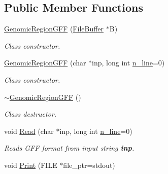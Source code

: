 \subsection*{Public Member Functions}
\begin{CompactItemize}
\item 
\hypertarget{classGenomicRegionGFF_9a49f0dc39116964f774e7ce78cfc827}{
\hyperlink{classGenomicRegionGFF_9a49f0dc39116964f774e7ce78cfc827}{GenomicRegionGFF} (\hyperlink{classFileBuffer}{FileBuffer} $\ast$B)}
\label{classGenomicRegionGFF_9a49f0dc39116964f774e7ce78cfc827}

\begin{CompactList}\small\item\em Class constructor. \item\end{CompactList}\item 
\hypertarget{classGenomicRegionGFF_59dee8d6f9e73b1da46386497030beb2}{
\hyperlink{classGenomicRegionGFF_59dee8d6f9e73b1da46386497030beb2}{GenomicRegionGFF} (char $\ast$inp, long int \hyperlink{classGenomicRegion_efe2255aeed5338060190ded05cb9c0c}{n\_\-line}=0)}
\label{classGenomicRegionGFF_59dee8d6f9e73b1da46386497030beb2}

\begin{CompactList}\small\item\em Class constructor. \item\end{CompactList}\item 
\hypertarget{classGenomicRegionGFF_3885d42a347283a5fed52791988076ad}{
\hyperlink{classGenomicRegionGFF_3885d42a347283a5fed52791988076ad}{$\sim$GenomicRegionGFF} ()}
\label{classGenomicRegionGFF_3885d42a347283a5fed52791988076ad}

\begin{CompactList}\small\item\em Class destructor. \item\end{CompactList}\item 
\hypertarget{classGenomicRegionGFF_eb1390d42b388e32d98f58f57a5c169c}{
void \hyperlink{classGenomicRegionGFF_eb1390d42b388e32d98f58f57a5c169c}{Read} (char $\ast$inp, long int \hyperlink{classGenomicRegion_efe2255aeed5338060190ded05cb9c0c}{n\_\-line}=0)}
\label{classGenomicRegionGFF_eb1390d42b388e32d98f58f57a5c169c}

\begin{CompactList}\small\item\em Reads GFF format from input string {\bf inp}. \item\end{CompactList}\item 
\hypertarget{classGenomicRegionGFF_3ffa71d729e4ff060a15a6bab1e924c8}{
void \hyperlink{classGenomicRegionGFF_3ffa71d729e4ff060a15a6bab1e924c8}{Print} (FILE $\ast$file\_\-ptr=stdout)}
\label{classGenomicRegionGFF_3ffa71d729e4ff060a15a6bab1e924c8}


\end{CompactItemize}
